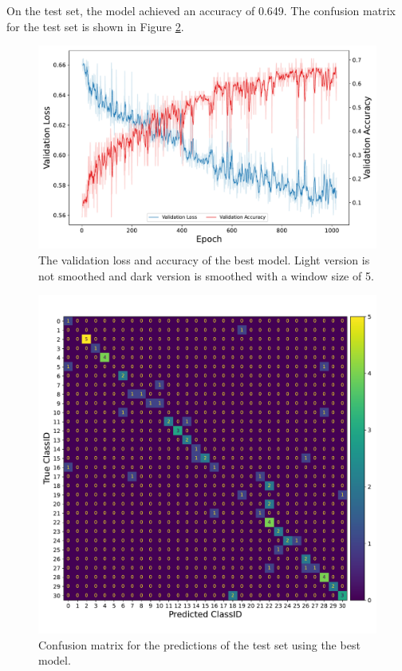 On the test set, the model achieved an accuracy of 0.649. 
The confusion matrix for the test set is shown in Figure \ref{fig:confusion_matrix_best}.

\begin{figure}[h!]
    \centering
    \captionsetup{width=.7\linewidth}
    \includegraphics[width=1\textwidth]{figures/loss_acc_best.pdf}
    \caption{
        The validation loss and accuracy of the best model. Light version is not smoothed 
        and dark version is smoothed with a window size of 5.}
    \label{fig:loss_acc_best}
\end{figure}


\begin{figure}[h!]
    \centering
    \captionsetup{width=.7\linewidth}
    \includegraphics[width=1\textwidth]{figures/confusion_matrix_best.pdf}
    \caption{Confusion matrix for the predictions of the test set using the best model.}
    \label{fig:confusion_matrix_best}
\end{figure}